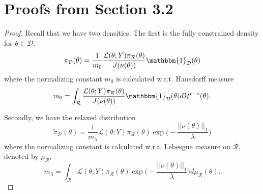 \documentclass[10pt,fleqn]{article}
\newcommand{\bb}[1]{\mathbb{#1}} \newcommand{\mc}[1]{\mathcal{#1}}
\DeclareMathOperator{\1}{\mathbbm{1}} \DeclareMathOperator{\bigO}{\mc O}
\begin{document}
\section{Proofs from Section 3.2}

\begin{proof}
Recall that we have two densities. The first is the fully constrained density for $\theta\in\mathcal{D}$.
\begin{equation*}
\pi_\mathcal{D}(\theta) = \frac{1}{m_0} \frac{\mathcal{L}(\theta;Y)\pi_\mathcal{R}(\theta)}{J(\nu(\theta))}\mathbbm{1}_\mathcal{D}(\theta)
\end{equation*}
where the normalizing constant $m_0$ is calculated w.r.t. Hausdorff measure
$$m_0 = \int_\mathcal{R} \frac{\mathcal{L}(\theta;Y)\pi_\mathcal{R}(\theta)}{J(\nu(\theta))}\mathbbm{1}_\mathcal{D}(\theta)d\bar{\mathcal{H}}^{r-s}(\theta).$$

Secondly, we have the relaxed distribution
$$\tilde{\pi}_\mathcal{D}(\theta) = \frac{1}{m_\lambda} \mathcal{L}(\theta;Y)\pi_\mathcal{R}(\theta)\exp\bigg(-\frac{||\nu(\theta)||_1}{\lambda}\bigg)$$
where the normalizing constant is calculated w.r.t. Lebesgue measure on $\mathcal{R}$, denoted by $\mu_\mathcal{R}$,
$$m_\lambda = \int_\mathcal{R}\mathcal{L}(\theta;Y)\pi_\mathcal{R}(\theta)\exp\bigg(-\frac{||\nu(\theta)||_1}{\lambda}\bigg) d\mu_\mathcal{R}(\theta).$$




\end{proof}
\end{document}
